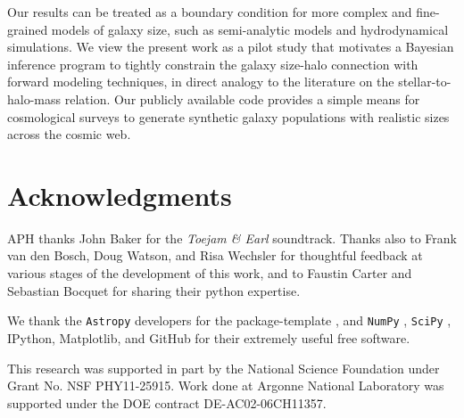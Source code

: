\documentclass[usenatbib,usegraphicx,letterpaper]{mn2e}
\begin{document}
Our results can be treated as a boundary condition for more complex and fine-grained models of galaxy size, such as semi-analytic models and hydrodynamical simulations. We view the present work as a pilot study that motivates a Bayesian inference program to tightly constrain the galaxy size-halo connection with forward modeling techniques, in direct analogy to the literature on the stellar-to-halo-mass relation. Our publicly available code provides a simple means for cosmological surveys to generate synthetic galaxy populations with realistic sizes across the cosmic web.

\section*{Acknowledgments}

APH thanks John Baker for the {\em Toejam \& Earl} soundtrack. Thanks also to Frank van den Bosch, Doug Watson, and Risa Wechsler for thoughtful feedback at various stages of the development of this work, and to Faustin Carter and Sebastian Bocquet for sharing their python expertise. 

We thank the {\tt Astropy} developers for the package-template \citep{astropy}, and {\tt NumPy} \citep{numpy_ndarray}, {\tt SciPy} \citep{scipy}, IPython, Matplotlib, and GitHub for their extremely useful free software.

This research was supported in part by the National Science Foundation under Grant No. NSF PHY11-25915. Work done at Argonne National Laboratory was supported under the DOE contract DE-AC02-06CH11357.


\end{document}
